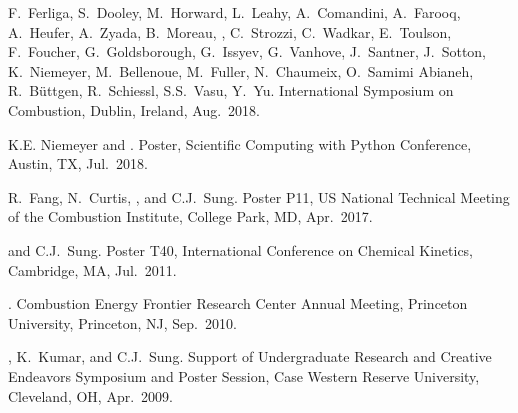 \begin{bibmune}
\item F.\ Ferliga, S.\ Dooley, M.\ Horward, L.\ Leahy, A.\ Comandini,
      A.\ Farooq, A.\ Heufer, A.\ Zyada, B.\ Moreau, ,
      C.\ Strozzi, C.\ Wadkar, E.\ Toulson, F.\ Foucher, G.\ Goldsborough,
      G.\ Issyev, G.\ Vanhove, J.\ Santner, J.\ Sotton, K.\ Niemeyer, M.\ Bellenoue,
      M.\ Fuller, N.\ Chaumeix, O.\ Samimi Abianeh, R.\ Büttgen, R.\ Schiessl,
      S.S.\ Vasu, Y.\ Yu. 
       International Symposium on Combustion, Dublin, Ireland, Aug.\ 2018.

\item K.E. Niemeyer and .
     Poster, 
    Scientific Computing with Python Conference, Austin, TX, Jul.\ 2018.\\

\item R.\ Fang, N.\ Curtis, , and C.J.\ Sung.
       Poster
      P11,  US National Technical Meeting of the Combustion
      Institute, College Park, MD, Apr.\ 2017.

\item {} and C.J.\ Sung.  Poster T40,  International
        Conference on Chemical Kinetics, Cambridge, MA, Jul.\ 2011.\\

\item {}. 
         Combustion Energy Frontier Research Center
        Annual Meeting, Princeton University, Princeton, NJ,
        Sep.\ 2010.\\

\item {}, K.\ Kumar, and C.J.\ Sung.  Support of Undergraduate
        Research and Creative Endeavors Symposium and Poster Session,
        Case Western Reserve University, Cleveland, OH, Apr.\ 2009.\\
\end{bibmune}

